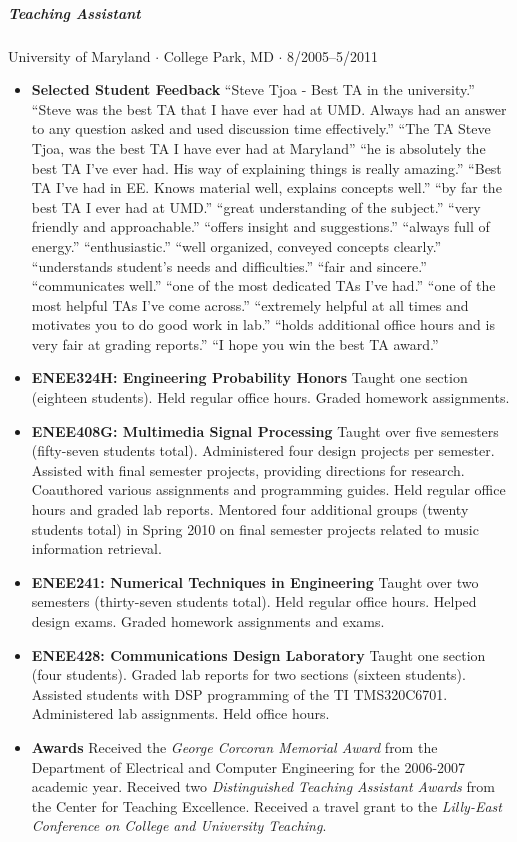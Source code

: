 \documentclass[10pt,letterpaper]{article}
\begin{document}
\subparagraph{Teaching Assistant}
University of Maryland $\cdot$ College Park, MD $\cdot$ 8/2005--5/2011
\begin{itemize}
\item \textbf{Selected Student Feedback}  ``Steve Tjoa - Best TA in the university.'' ``Steve was the best TA that I have ever had at UMD. Always had an answer to any question asked and used discussion time effectively.'' ``The TA Steve Tjoa, was the best TA I have ever had at Maryland'' ``he is absolutely the best TA I've ever had. His way of explaining things is really amazing.'' ``Best TA I've had in EE. Knows material well, explains concepts well.'' ``by far the best TA I ever had at UMD.''  ``great understanding of the subject.'' ``very friendly and approachable.'' ``offers insight and suggestions.'' ``always full of energy.''  ``enthusiastic.'' ``well organized, conveyed concepts clearly.'' ``understands student's needs and difficulties.'' ``fair and sincere.'' ``communicates well.'' ``one of the most dedicated TAs I've had.'' ``one of the most helpful TAs I've come across.'' ``extremely helpful at all times and motivates you to do good work in lab.'' ``holds additional office hours and is very fair at grading reports.'' ``I hope you win the best TA award.''
\item \textbf{ENEE324H: Engineering Probability Honors}  Taught one section (eighteen students). Held regular office hours. Graded homework assignments.
\item \textbf{ENEE408G: Multimedia Signal Processing} Taught over five semesters (fifty-seven students total). Administered four design projects per semester. Assisted with final semester projects, providing directions for research. Coauthored various assignments and programming guides. Held regular office hours and graded lab reports. Mentored four additional groups (twenty students total) in Spring 2010 on final semester projects related to music information retrieval.
\item \textbf{ENEE241: Numerical Techniques in Engineering} Taught over two semesters (thirty-seven students total). Held regular office hours. Helped design exams. Graded homework assignments and exams.
\item \textbf{ENEE428: Communications Design Laboratory} Taught one section (four students). Graded lab reports for two sections (sixteen students). Assisted students with DSP programming of the TI TMS320C6701. Administered lab assignments. Held office hours.
\item \textbf{Awards} Received the \textit{George Corcoran Memorial Award} from the Department of Electrical and Computer Engineering for the 2006-2007 academic year.  Received two \textit{Distinguished Teaching Assistant Awards} from the Center for Teaching Excellence.  Received a travel grant to the \textit{Lilly-East Conference on College and University Teaching}.
\end{itemize}
\end{document}
